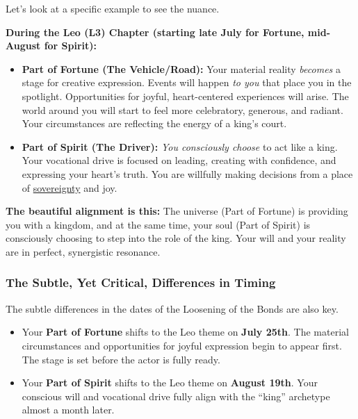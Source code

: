 \documentclass{article}
\begin{document}
Let's look at a specific example to see the nuance.

\textbf{During the Leo (L3) Chapter (starting late July for Fortune, mid-August for Spirit):}

\begin{itemize}
\item
  \textbf{Part of Fortune (The Vehicle/Road):} Your material reality \emph{becomes} a stage for creative expression. Events will happen \emph{to you} that place you in the spotlight. Opportunities for joyful, heart-centered experiences will arise. The world around you will start to feel more celebratory, generous, and radiant. Your circumstances are reflecting the energy of a king's court.
\item
  \textbf{Part of Spirit (The Driver):} \emph{You consciously choose} to act like a king. Your vocational drive is focused on leading, creating with confidence, and expressing your heart's truth. You are willfully making decisions from a place of \hyperlink{gloss:sovereignty}{sovereignty} and joy.
\end{itemize}

\textbf{The beautiful alignment is this:} The universe (Part of Fortune) is providing you with a kingdom, and at the same time, your soul (Part of Spirit) is consciously choosing to step into the role of the king. Your will and your reality are in perfect, synergistic resonance.

\subsubsection*{The Subtle, Yet Critical, Differences in Timing}\label{the-subtle-yet-critical-differences-in-timing}

The subtle differences in the dates of the Loosening of the Bonds are also key.

\begin{itemize}
\item
  Your \textbf{Part of Fortune} shifts to the Leo theme on \textbf{July 25th}. The material circumstances and opportunities for joyful expression begin to appear first. The stage is set before the actor is fully ready.
\item
  Your \textbf{Part of Spirit} shifts to the Leo theme on \textbf{August 19th}. Your conscious will and vocational drive fully align with the ``king'' archetype almost a month later.
\end{itemize}
\end{document}
